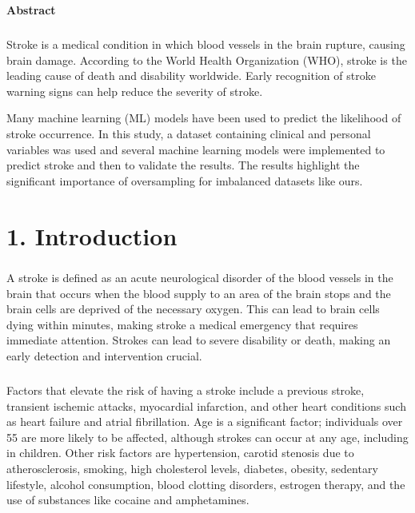 \documentclass[a4paper]{report}
\begin{document}
	\newpage
	\begin{center}
		{\fontsize{16pt}{20pt}\selectfont \textbf{Abstract}}\\
	\end{center}
	\paragraph{} \Large
	
	Stroke is a medical condition in which blood vessels in the brain rupture, causing brain damage. According to the World Health Organization (WHO), stroke is the leading cause of death and disability worldwide. Early recognition of stroke warning signs can help reduce the severity of stroke.
	
	Many machine learning (ML) models have been used to predict the likelihood of stroke occurrence. In this study, a dataset containing clinical and personal variables was used and several machine learning models were implemented to predict stroke and then to validate the results. The results highlight the significant importance of oversampling for imbalanced datasets like ours.
	\pagebreak
	
	\renewcommand*\contentsname{Table of contents}
	\tableofcontents
	
	
	
	\chapter*{\huge 1. Introduction} 
	\paragraph{}\Large
	A stroke is defined as an acute neurological disorder of the blood vessels in the brain that occurs when the blood supply to an area of the brain stops and the brain cells are deprived of the necessary oxygen. This can lead to brain cells dying within minutes, making stroke a medical emergency that requires immediate attention. Strokes can lead to severe disability or death, making an early detection and intervention crucial. 
	
	\paragraph{} \Large
	Factors that elevate the risk of having a stroke include a previous stroke, transient ischemic attacks, myocardial infarction, and other heart conditions such as heart failure and atrial fibrillation. Age is a significant factor; individuals over 55 are more likely to be affected, although strokes can occur at any age, including in children. Other risk factors are hypertension, carotid stenosis due to atherosclerosis, smoking, high cholesterol levels, diabetes, obesity, sedentary lifestyle, alcohol consumption, blood clotting disorders, estrogen therapy, and the use of substances like cocaine and amphetamines. 
	
\end{document}
